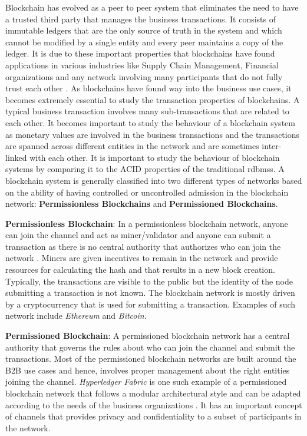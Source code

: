 \documentclass[
  a4paper,  %
  twoside,  %
  bibliography=totoc,
  headsepline,
  cleardoublepage=empty,
  parskip=half,
  draft=false
]{scrbook}
\begin{document}
Blockchain has evolved as a peer to peer system that eliminates the need to have a trusted third party that manages the business transactions. It consists of immutable ledgers that are the only source of truth in the system and which cannot be modified by a single entity and every peer maintains a copy of the ledger. It is due to these important properties that blockchains have found applications in various industries like Supply Chain Management, Financial organizations and any network involving many participants that do not fully trust each other \cite{BC}. As blockchains have found way into the business use cases, it becomes extremely essential to study the transaction properties of blockchains. A typical business transaction involves many sub-transactions that are related to each other. It becomes important to study the behaviour of a blockchain system as monetary values are involved in the business transactions and the transactions are spanned across different entities in the network and are sometimes inter-linked with each other. It is important to study the behaviour of blockchain systems by comparing it to the ACID properties of the traditional \glspl{rdbms}. A blockchain system is generally classified into two different types of networks based on the ability of having controlled or uncontrolled admission in the blockchain network: \textbf{Permissionless Blockchains} and \textbf{Permissioned Blockchains}. 

\textbf{Permissionless Blockchain}: In a permissionless blockchain network, anyone can join the channel and act as miner/validator and anyone can submit a transaction as there is no central authority that authorizes who can join the network \cite{PLB}. Miners are given incentives to remain in the network and provide resources for calculating the hash and that results in a new block creation. Typically, the transactions are visible to the public but the identity of the node submitting a transaction is not known. The blockchain network is mostly driven by a cryptocurrency that is used for submitting a transaction. Examples of such network include \textit{Ethereum} and \textit{Bitcoin}.

\textbf{Permissioned Blockchain}: A permissioned blockchain network has a central authority that governs the rules about who can join the channel and submit the transactions. Most of the permissioned blockchain networks are built around the B2B use cases and hence, involves proper management about the right entities joining the channel. \textit{Hyperledger Fabric} is one such example of a permissioned blockchain network that follows a modular architectural style and can be adapted according to the needs of the business organizations \cite{HF}. It has an important concept of channels that provides privacy and confidentiality to a subset of participants in the network. 
\end{document}
